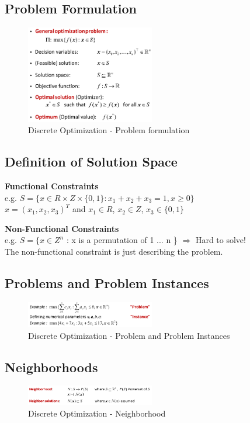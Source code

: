 \subsection{Problem Formulation}

\begin{figure}[H]
\centering
\includegraphics[width=0.5\textwidth]{figures/problem_formulation.png}
\caption{Discrete Optimization - Problem formulation}
\end{figure}

\subsection{Definition of Solution Space}
\textbf{Functional Constraints} \\
e.g. $S = \{x \in R \times Z \times \{0,1\}:x_1 + x_2 + x_3 = 1, x \geq 0\}$ \\
$x = (x_1, x_2, x_3)^T$ and $x_1 \in R$, $x_2 \in Z$, $x_3 \in \{0,1\}$

\textbf{Non-Functional Constraints} \\
e.g. $S = \{x \in Z^n$ : x is a permutation of 1 ... n \} $\Rightarrow$ Hard to solve! \\
The non-functional constraint is just describing the problem.

\subsection{Problems and Problem Instances}
\begin{figure}[H]
\centering
\includegraphics[width=0.5\textwidth]{figures/problemandinstance.png}
\caption{Discrete Optimization - Problem and Problem Instances}
\end{figure}

\subsection{Neighborhoods}
\begin{figure}[H]
\centering
\includegraphics[width=0.5\textwidth]{figures/neighborhood.png}
\caption{Discrete Optimization - Neighborhood}
\end{figure}

